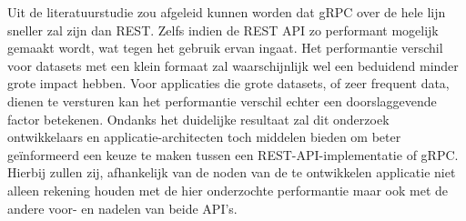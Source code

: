 Uit de literatuurstudie zou afgeleid kunnen worden dat gRPC over de hele lijn sneller zal zijn dan REST. Zelfs indien de REST API zo performant mogelijk
gemaakt wordt, wat tegen het gebruik ervan ingaat. Het performantie verschil voor datasets met een klein formaat zal waarschijnlijk wel een
beduidend minder grote impact hebben. Voor applicaties die grote datasets, of zeer frequent data, dienen te versturen kan het performantie verschil echter
een doorslaggevende factor betekenen. Ondanks het duidelijke resultaat zal dit onderzoek ontwikkelaars en applicatie-architecten toch middelen bieden om
beter geïnformeerd een keuze te maken tussen een REST-API-implementatie of gRPC. Hierbij zullen zij, afhankelijk van de noden van de te ontwikkelen applicatie
niet alleen rekening houden met de hier onderzochte performantie maar ook met de andere voor- en nadelen van beide API's.

